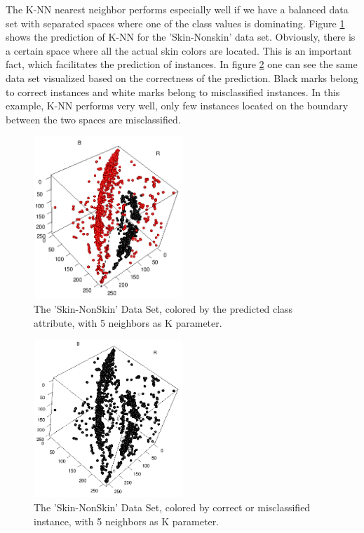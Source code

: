 \documentclass[paper=a4, fontsize=11pt]{scrartcl} %
\numberwithin{equation}{section} %
\numberwithin{figure}{section} %
\numberwithin{table}{section} %
\begin{document}
The K-NN nearest neighbor performs especially well if we have a balanced data set with separated spaces where one of the class values is dominating. Figure \ref{fig:skin:predicted:k5} shows the prediction of K-NN for the 'Skin-Nonskin' data set. Obviously, there is a certain space where all the actual skin colors are located. This is an important fact, which facilitates the prediction of instances. In figure \ref{fig:skin:correct:k5} one can see the same data set visualized based on the correctness of the prediction. Black marks belong to correct instances and white marks belong to misclassified instances. In this example, K-NN performs very well, only few instances located on the boundary between the two spaces are misclassified.

\begin{figure}[0.5\textwidth]
    \begin{center}
        \includegraphics[width=0.5\textwidth]{Skin_predicted_k5}
    \end{center}
    \caption['Skin-NonSkin' prediction with k=5]{The 'Skin-NonSkin' Data Set, colored by the predicted class attribute, with 5 neighbors as K parameter.}
    \label{fig:skin:predicted:k5}
\end{figure}

\begin{figure}[0.5\textwidth]
    \begin{center}
\includegraphics[width=0.5\textwidth]{Skin_correct_k5}
    \end{center}
\caption['Skin-NonSkin' correctness with k=5]{The 'Skin-NonSkin' Data Set, colored by correct or misclassified instance, with 5 neighbors as K parameter.}
\label{fig:skin:correct:k5}
\end{figure}
\end{document}

